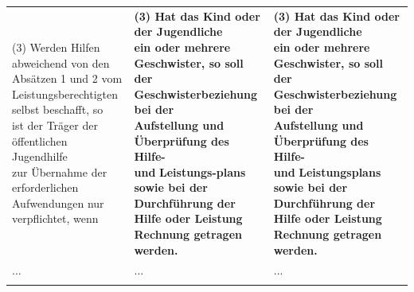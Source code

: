 \documentclass[10pt,a4paper,landscape]{article}
\begin{document}
\begin{longtable}{|L{8.2cm}|L{8.2cm}|L{8.2cm}|}
(3) \textcolor{diffred}{Werden Hilfen abweichend von den  \newline Absätzen 1} und \textcolor{diffred}{2 vom  \newline Leistungsberechtigten selbst beschafft, so  \newline ist} der \textcolor{diffred}{Träger} der \textcolor{diffred}{öffentlichen Jugendhilfe  \newline zur Übernahme der erforderlichen  \newline Aufwendungen nur verpflichtet, wenn} & \textbf{(3) Hat das Kind oder der Jugendliche  \newline ein oder mehrere Geschwister, so soll  \newline der Geschwisterbeziehung bei der  \newline Aufstellung und Überprüfung des Hilfe-  \newline und }\textbf{\textcolor{diffred}{Leistungs-plans}}\textbf{ sowie bei der  \newline Durchführung der Hilfe oder Leistung  \newline Rechnung getragen werden. } & \textbf{(3) Hat das Kind oder der Jugendliche  \newline ein oder mehrere Geschwister, so soll  \newline der Geschwisterbeziehung bei der  \newline Aufstellung und Überprüfung des Hilfe-  \newline und }\textbf{\textcolor{diffgreen}{Leistungsplans}}\textbf{ sowie bei der  \newline Durchführung der Hilfe oder Leistung  \newline Rechnung getragen werden. } \\
\hhline{|---|}
... & ... & ... \\
\hhline{|---|}

\end{longtable}
\end{document}

